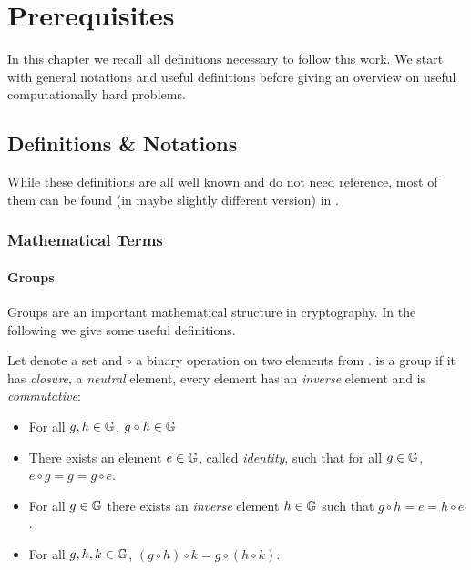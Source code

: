 \chapter{Prerequisites}\label{ch:background}
In this chapter we recall all definitions necessary to follow this work.
We start with general notations and useful definitions before giving an overview on useful computationally hard problems.

\section{Definitions \& Notations}
While these definitions are all well known and do not need reference, most of them can be found (in maybe slightly different version) in \cite{katz2008introduction}.

\subsection{Mathematical Terms}

\subsubsection{Groups}
Groups are an important mathematical structure in cryptography.
In the following we give some useful definitions.

\begin{definition}[Groups]\label{def:groups}
Let \GG denote a set and $\circ$ a binary operation on two elements from \GG.
\GG is a group if it has \emph{closure}, a \emph{neutral} element, every element has an \emph{inverse} element and is \emph{commutative}:
\begin{itemize}
	\item For all $g,h\in\mathbb{G}$, $g\circ h \in\mathbb{G}$
	\item There exists an element $e\in\mathbb{G}$, called \emph{identity}, such that for all $g\in\mathbb{G}$, $e\circ g=g=g\circ e$.
	\item For all $g\in\mathbb{G}$ there exists an \emph{inverse} element $h\in\mathbb{G}$ such that $g\circ h=e=h\circ e$.
	\item For all $g,h,k\in\mathbb{G}$, $(g\circ h)\circ k=g\circ (h \circ k)$.
\end{itemize}
\eod
\end{definition}

